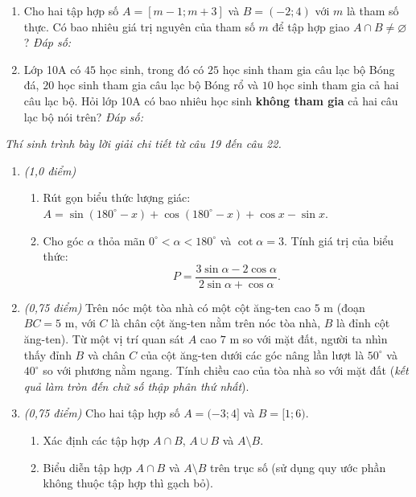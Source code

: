 \documentclass[12pt,a4paper]{article}
\newcommand{\parttitle}[1]{\par\vspace{2pt}{\large\bfseries\color{ink}#1}\par\vspace{1pt}}
\newcommand{\answerbox}{\hfill\textit{Đáp số:}\ \fbox{\rule{0pt}{12pt}\hspace{2.2cm}}}
\begin{document}
\begin{enumerate}[resume]
\item Cho hai tập hợp số $A = [m - 1; m + 3]$ và $B = (-2; 4)$ với $m$ là tham số thực. Có bao nhiêu giá trị nguyên của tham số $m$ để tập hợp giao $A \cap B \ne \varnothing$?
\answerbox

\item Lớp 10A có $45$ học sinh, trong đó có $25$ học sinh tham gia câu lạc bộ Bóng đá, $20$ học sinh tham gia câu lạc bộ Bóng rổ và $10$ học sinh tham gia cả hai câu lạc bộ. Hỏi lớp 10A có bao nhiêu học sinh \textbf{không tham gia} cả hai câu lạc bộ nói trên?
\answerbox
\end{enumerate}

\parttitle{PHẦN IV. Tự luận}
\textit{Thí sinh trình bày lời giải chi tiết từ câu 19 đến câu 22.}
\begin{enumerate}[resume]
\item \textit{(1,0 điểm)}
\begin{enumerate}
    \item Rút gọn biểu thức lượng giác: $A = \sin(180^\circ - x) + \cos(180^\circ - x) + \cos x - \sin x$.
    \item Cho góc $\alpha$ thỏa mãn $0^\circ < \alpha < 180^\circ$ và $\cot \alpha = 3$. Tính giá trị của biểu thức:
    \[
    P = \dfrac{3\sin \alpha - 2\cos \alpha}{2\sin \alpha + \cos \alpha}.
    \]
\end{enumerate}

\item \textit{(0,75 điểm)} Trên nóc một tòa nhà có một cột ăng-ten cao $5\text{ m}$ (đoạn $BC = 5\text{ m}$, với $C$ là chân cột ăng-ten nằm trên nóc tòa nhà, $B$ là đỉnh cột ăng-ten). Từ một vị trí quan sát $A$ cao $7\text{ m}$ so với mặt đất, người ta nhìn thấy đỉnh $B$ và chân $C$ của cột ăng-ten dưới các góc nâng lần lượt là $50^\circ$ và $40^\circ$ so với phương nằm ngang. Tính chiều cao của tòa nhà so với mặt đất (\textit{kết quả làm tròn đến chữ số thập phân thứ nhất}).

\item \textit{(0,75 điểm)} Cho hai tập hợp số $A = (-3; 4]$ và $B = [1; 6)$.
\begin{enumerate}
    \item Xác định các tập hợp $A \cap B$, $A \cup B$ và $A \setminus B$.
    \item Biểu diễn tập hợp $A \cap B$ và $A \setminus B$ trên trục số (sử dụng quy ước phần không thuộc tập hợp thì gạch bỏ).
\end{enumerate}


\end{enumerate}
\end{document}
